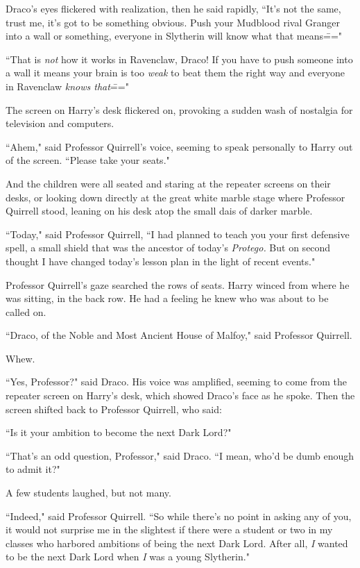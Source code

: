 Draco's eyes flickered with realization, then he said rapidly, ``It's not the same, trust me, it's got to be something obvious. Push your Mudblood rival Granger into a wall or something, everyone in Slytherin will know what that means\==="

``That is \emph{not} how it works in Ravenclaw, Draco! If you have to push someone into a wall it means your brain is too \emph{weak} to beat them the right way and everyone in Ravenclaw \emph{knows that}\==="

The screen on Harry's desk flickered on, provoking a sudden wash of nostalgia for television and computers.

``Ahem," said Professor Quirrell's voice, seeming to speak personally to Harry out of the screen. ``Please take your seats."

\later

And the children were all seated and staring at the repeater screens on their desks, or looking down directly at the great white marble stage where Professor Quirrell stood, leaning on his desk atop the small dais of darker marble.

``Today," said Professor Quirrell, ``I had planned to teach you your first defensive spell, a small shield that was the ancestor of today's \emph{Protego.} But on second thought I have changed today's lesson plan in the light of recent events."

Professor Quirrell's gaze searched the rows of seats. Harry winced from where he was sitting, in the back row. He had a feeling he knew who was about to be called on.

``Draco, of the Noble and Most Ancient House of Malfoy," said Professor Quirrell.

Whew.

``Yes, Professor?" said Draco. His voice was amplified, seeming to come from the repeater screen on Harry's desk, which showed Draco's face as he spoke. Then the screen shifted back to Professor Quirrell, who said:

``Is it your ambition to become the next Dark Lord?"

``That's an odd question, Professor," said Draco. ``I mean, who'd be dumb enough to admit it?"

A few students laughed, but not many.

``Indeed," said Professor Quirrell. ``So while there's no point in asking any of you, it would not surprise me in the slightest if there were a student or two in my classes who harbored ambitions of being the next Dark Lord. After all, \emph{I} wanted to be the next Dark Lord when \emph{I} was a young Slytherin."

